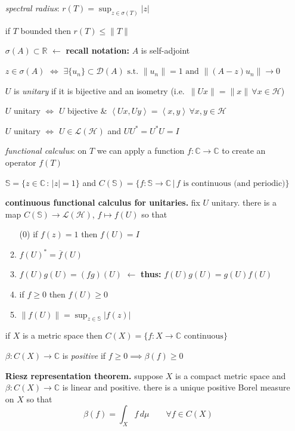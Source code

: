 \documentclass[11pt]{article}
\newcommand{\cD}{\mathcal{D}}
\newcommand{\cH}{\mathcal{H}}
\newcommand{\cL}{\mathcal{L}}
\newcommand{\CC}{\mathbb{C}}
\newcommand{\RR}{\mathbb{R}}
\renewcommand{\SS}{\mathbb{S}}
\newcommand{\ip}[2]{\left<#1,#2\right>}
\begin{document}
\begin{itemize}[leftmargin=10mm,itemsep=0mm]
\item[\df{85}] \emph{spectral radius}: $r(T) = \sup_{z \in \sigma(T)} |z|$
\item[\ft{85}] if $T$ bounded then $r(T) \le \|T\|$
\item[\ft{86}] $\sigma(A)\subset \RR$ \hfill {\footnotesize $\leftarrow$ \textbf{recall notation:} $A$ is self-adjoint}
\item[\ft{87}] $z\in\sigma(A)$ $\iff$ $\exists \{u_n\}\subset \cD(A) \text{ s.t.~} \|u_n\|=1 \text{ and } \|(A-z)u_n\| \to 0$
\item[\df{17}] $U$ is \emph{unitary} if it is bijective and an isometry (i.e.~$\|Ux\|=\|x\|\,\forall x\in\cH$)
\item[\ft{17}] $U$ unitary $\iff$ $U$ bijective \& $\ip{Ux}{Uy}=\ip{x}{y}\,\forall x,y\in\cH$
\item[\ft{102}] $U$ unitary $\iff$ $U\in\cL(\cH)$ and $UU^* = U^*U=I$
\item[\df{102}] \emph{functional calculus}: on $T$ we can apply a function $f:\CC\to\CC$ to create an operator $f(T)$
\item[\df{102}] $\SS = \{z\in\CC\,:\,|z|=1\}$ and $C(\SS)=\{f:\SS\to\CC\,|\,f \text{ is continuous (and periodic)}\}$
\item[\ft{103}] \textbf{continuous functional calculus for unitaries.} fix $U$ unitary. there is a map $C(\SS) \to \cL(\cH)$, $f\mapsto f(U)$ so that
\renewcommand{\labelenumi}{(\alph{enumi})}
\begin{enumerate}
\item[(0)] if $f(z) = 1$ then $f(U) = I$
\setcounter{enumi}{0}
\item $f(U)^*=\overline{f}(U)$
\item $f(U)g(U) = (fg)(U)$ \hfill {\footnotesize $\leftarrow$ \textbf{thus:} $f(U)g(U)=g(U)f(U)$}
\item if $f\ge 0$ then $f(U)\ge 0$
\item $\|f(U)\| = \sup_{z\in\SS} |f(z)|$
\end{enumerate}
\item[\df{105}] if $X$ is a metric space then $C(X) = \{f:X\to\CC \text{ continuous}\}$
\item[\df{105}] $\beta:C(X)\to\CC$ is \emph{positive} if $f\ge 0 \implies \beta(f)\ge 0$
\item[\ft{105}] \textbf{Riesz representation theorem.} suppose $X$ is a compact metric space and $\beta:C(X) \to \CC$ is linear and positive. there is a unique positive Borel measure on $X$ so that
	$$\beta(f) = \int_X f\,d\mu \qquad \forall f \in C(X)$$

\end{itemize}
\end{document}
